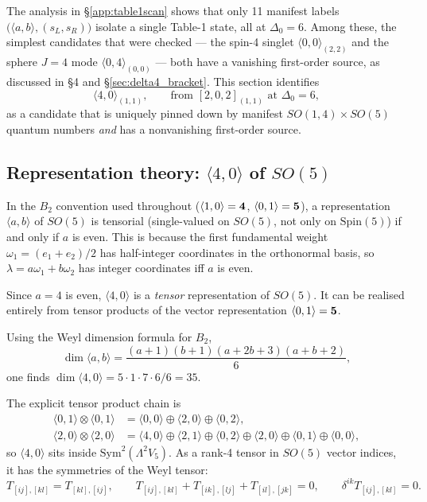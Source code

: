 \documentclass[12pt]{article}
\def\be{\begin{equation}}
\def\ee{\end{equation}}
\def\ie{\begin{equation}\begin{aligned}}
\def\fe{\end{aligned}\end{equation}}
\newcommand{\D}{\ensuremath{\Delta}}
\begin{document}
The analysis in \S\ref{app:table1scan} shows that only 11 manifest labels
$\big(\langle a,b\rangle,(s_L,s_R)\big)$ isolate a single Table-1 state, all at $\D_0=6$.
Among these, the simplest candidates that were checked --- the spin-4 singlet
$\langle 0,0\rangle_{(2,2)}$ and the sphere $J\!=\!4$ mode $\langle 0,4\rangle_{(0,0)}$
--- both have a vanishing first-order source, as discussed in \S4 and \S\ref{sec:delta4_bracket}.
This section identifies
\be
\langle 4,0\rangle_{(1,1)},\qquad\text{from }[2,0,2]_{(1,1)}\text{ at }\D_0=6,
\ee
as a candidate that is uniquely pinned down by manifest $SO(1,4)\times SO(5)$
quantum numbers \emph{and} has a nonvanishing first-order source.

\subsection{Representation theory: \texorpdfstring{$\langle 4,0\rangle$}{<4,0>} of \texorpdfstring{$SO(5)$}{SO(5)}}

In the $B_2$ convention used throughout ($\langle 1,0\rangle={\bf 4}$, $\langle 0,1\rangle={\bf 5}$),
a representation $\langle a,b\rangle$ of $SO(5)$ is tensorial (single-valued on $SO(5)$, not only
on $\mathrm{Spin}(5)$) if and only if $a$ is even.
This is because the first fundamental weight $\omega_1=(e_1+e_2)/2$
has half-integer coordinates in the orthonormal basis, so $\lambda=a\omega_1+b\omega_2$ has
integer coordinates iff $a$ is even.

Since $a=4$ is even, $\langle 4,0\rangle$ is a \emph{tensor} representation of $SO(5)$.
It can be realised entirely from tensor products of the vector representation $\langle 0,1\rangle={\bf 5}$.

Using the Weyl dimension formula for $B_2$,
\be
\dim\langle a,b\rangle = \frac{(a+1)(b+1)(a+2b+3)(a+b+2)}{6},
\ee
one finds $\dim\langle 4,0\rangle = 5\cdot 1\cdot 7\cdot 6/6 = 35$.

The explicit tensor product chain is
\ie
\langle 0,1\rangle\otimes\langle 0,1\rangle
&= \langle 0,0\rangle\oplus\langle 2,0\rangle\oplus\langle 0,2\rangle,\\
\langle 2,0\rangle\otimes\langle 2,0\rangle
&= \langle 4,0\rangle\oplus\langle 2,1\rangle\oplus\langle 0,2\rangle
\oplus\langle 2,0\rangle\oplus\langle 0,1\rangle\oplus\langle 0,0\rangle,
\fe
so $\langle 4,0\rangle$ sits inside $\mathrm{Sym}^2(\Lambda^2 V_5)$.
As a rank-4 tensor in $SO(5)$ vector indices, it has the symmetries of the Weyl tensor:
\be
T_{[ij],[kl]}=T_{[kl],[ij]},\qquad
T_{[ij],[kl]}+T_{[ik],[lj]}+T_{[il],[jk]}=0,\qquad
\delta^{ik}T_{[ij],[kl]}=0.
\ee
\end{document}

